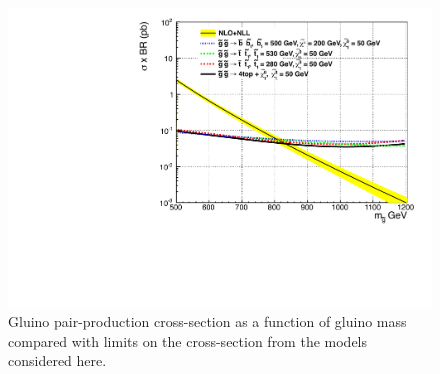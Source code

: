 


\begin{figure}[htb]
\begin{center}
\includegraphics[width=0.48\linewidth]{figs/gluino1dSum.pdf}
\caption{Gluino pair-production cross-section
as a function of gluino mass compared with limits
on the cross-section from the models considered here.
\label{fig:gluinoLimit1d}}
\end{center}
\end{figure}











\clearpage
